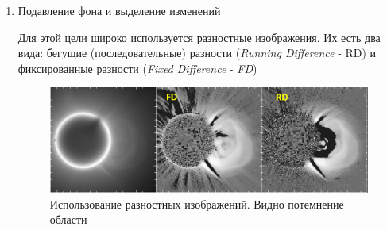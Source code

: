 \begin{enumerate}
	\item \textsf{Подавление фона и выделение изменений}
	
	Для этой цели широко используется разностные изображения. Их есть два вида: бегущие (последовательные) разности (\textit{Running Difference} - RD) и фиксированные разности (\textit{Fixed Difference} - \textit{FD})
	
	\begin{figure}[h!]
		\centering
		\includegraphics[width=0.7\linewidth]{images/grechnev8.png}
		\caption{Использование разностных изображений. Видно потемнение области }
		\label{grechnev8}
	\end{figure}		
\end{enumerate}